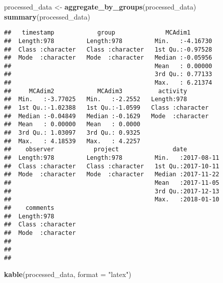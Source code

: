 \documentclass[]{article}
\newenvironment{Shaded}{\begin{snugshade}}{\end{snugshade}}
\newcommand{\KeywordTok}[1]{\textcolor[rgb]{0.13,0.29,0.53}{\textbf{{#1}}}}
\newcommand{\DataTypeTok}[1]{\textcolor[rgb]{0.13,0.29,0.53}{{#1}}}
\newcommand{\StringTok}[1]{\textcolor[rgb]{0.31,0.60,0.02}{{#1}}}
\newcommand{\NormalTok}[1]{{#1}}
\begin{document}
\begin{Shaded}
\begin{Highlighting}[]
  \NormalTok{processed_data <-}\StringTok{ }\KeywordTok{aggregate_by_groups}\NormalTok{(processed_data)}
  \KeywordTok{summary}\NormalTok{(processed_data)}
\end{Highlighting}
\end{Shaded}

\begin{verbatim}
##   timestamp            group              MCAdim1        
##  Length:978         Length:978         Min.   :-4.16730  
##  Class :character   Class :character   1st Qu.:-0.97528  
##  Mode  :character   Mode  :character   Median :-0.05956  
##                                        Mean   : 0.00000  
##                                        3rd Qu.: 0.77133  
##                                        Max.   : 6.21374  
##     MCAdim2            MCAdim3          activity        
##  Min.   :-3.77025   Min.   :-2.2552   Length:978        
##  1st Qu.:-1.02388   1st Qu.:-1.0599   Class :character  
##  Median :-0.04849   Median :-0.1629   Mode  :character  
##  Mean   : 0.00000   Mean   : 0.0000                     
##  3rd Qu.: 1.03097   3rd Qu.: 0.9325                     
##  Max.   : 4.18539   Max.   : 4.2257                     
##    observer           project               date           
##  Length:978         Length:978         Min.   :2017-08-11  
##  Class :character   Class :character   1st Qu.:2017-10-11  
##  Mode  :character   Mode  :character   Median :2017-11-22  
##                                        Mean   :2017-11-05  
##                                        3rd Qu.:2017-12-13  
##                                        Max.   :2018-01-10  
##    comments        
##  Length:978        
##  Class :character  
##  Mode  :character  
##                    
##                    
## 
\end{verbatim}

\begin{Shaded}
\begin{Highlighting}[]
  \KeywordTok{kable}\NormalTok{(processed_data, }\DataTypeTok{format =} \StringTok{"latex"}\NormalTok{)}
\end{Highlighting}
\end{Shaded}
\end{document}
